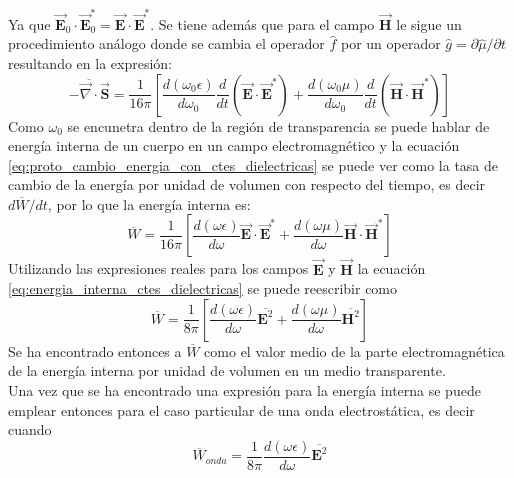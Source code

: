\documentclass[../tesis_main_file.tex]{subfiles}
\begin{document}
Ya que $\overrightarrow{\textbf{E}}_0\cdot \overrightarrow{\textbf{E}}_0^* = \overrightarrow{\textbf{E}}\cdot \overrightarrow{\textbf{E}}^*$. Se tiene además que para el campo $\overrightarrow{\textbf{H}}$ le sigue un procedimiento análogo donde se cambia el operador $\widehat{f}$ por un operador $\widehat{g}=\partial \widehat{\mu}/\partial t$ resultando en la expresión: 
\begin{equation}
\label{eq:proto_cambio_energia_con_ctes_dielectricas}\overline{-\overrightarrow{\nabla} \cdot \overrightarrow{\textbf{S}}} = \frac{1}{16\pi}\left[\frac{d(\omega_0 \epsilon)}{d\omega_0}\frac{d}{dt}\left(\overrightarrow{\textbf{E}}\cdot \overrightarrow{\textbf{E}}^*\right) + \frac{d(\omega_0 \mu)}{d\omega_0}\frac{d}{dt}\left(\overrightarrow{\textbf{H}}\cdot \overrightarrow{\textbf{H}}^*\right)\right]
\end{equation}
Como $\omega_0$ se encunetra dentro de la región de transparencia se puede hablar de energía interna de un cuerpo en un campo electromagnético y la ecuación \ref{eq:proto_cambio_energia_con_ctes_dielectricas} se puede ver como la tasa de cambio de la energía por unidad de volumen con respecto del tiempo, es decir $d\overline{W}/dt$, por lo que la energía interna es:
\begin{equation}
\label{eq:energia_interna_ctes_dielectricas}
\overline{W}=\frac{1}{16\pi}\left[\frac{d(\omega \epsilon)}{d\omega}\overrightarrow{\textbf{E}}\cdot \overrightarrow{\textbf{E}}^* + \frac{d(\omega \mu )}{d\omega}\overrightarrow{\textbf{H}}\cdot \overrightarrow{\textbf{H}}^*\right]
\end{equation}
Utilizando las expresiones reales para los campos $\overrightarrow{\textbf{E}}$ y $\overrightarrow{\textbf{H}}$ la ecuación \ref{eq:energia_interna_ctes_dielectricas} se puede reescribir como
\begin{equation}
\label{eq:energia_interna_electro_promedio_real}
\overline{W}=\frac{1}{8\pi}\left[\frac{d(\omega \epsilon)}{d\omega}\overline{\textbf{E}^2} + \frac{d(\omega \mu )}{d\omega}\overline{\textbf{H}^2}\right]
\end{equation}
Se ha encontrado entonces a $\overline{W}$ como el valor medio de la parte electromagnética de la energía interna por unidad de volumen en un medio transparente.\\
Una vez que se ha encontrado una expresión para la energía interna se puede emplear entonces para el caso particular de una onda electrostática, es decir cuando
\begin{equation}
\overline{W}_{onda}= \frac{1}{8\pi}\frac{d(\omega \epsilon)}{d\omega}\overline{\textbf{E}^2}
\end{equation}
\end{document}
